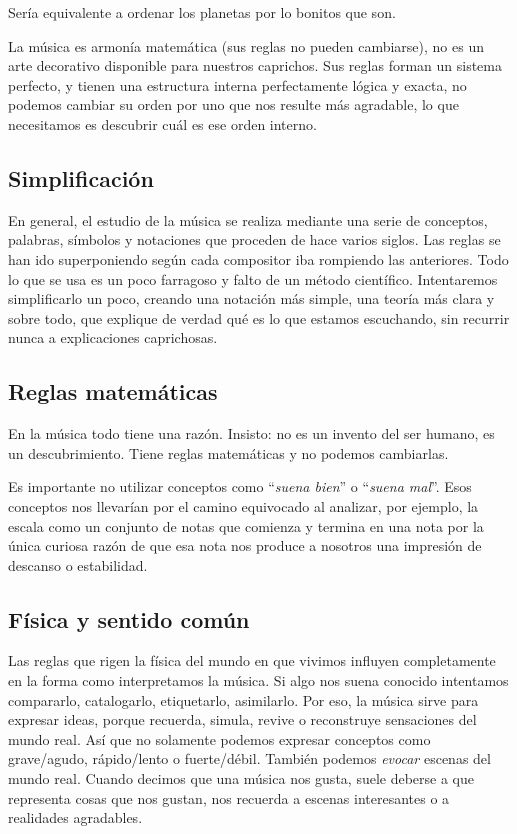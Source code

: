 \documentclass[]{report}
\begin{document}
Sería equivalente a ordenar los planetas por lo bonitos que son.

La música es armonía matemática (sus reglas no pueden cambiarse), no es un arte decorativo disponible para nuestros caprichos. Sus reglas forman un sistema perfecto, y tienen una estructura interna perfectamente lógica y exacta, no podemos cambiar su orden por uno que nos resulte más agradable, lo que necesitamos es descubrir cuál es ese orden interno.

\subsection{Simplificación}

En general, el estudio de la música se realiza mediante una serie de conceptos, palabras, símbolos y notaciones que proceden de hace varios siglos. Las reglas se han ido superponiendo según cada compositor iba rompiendo las anteriores. Todo lo que se usa es un poco farragoso y falto de un método científico. Intentaremos simplificarlo un poco, creando una notación más simple, una teoría más clara y sobre todo, que explique de verdad qué es lo que estamos escuchando, sin recurrir nunca a explicaciones caprichosas.

\subsection{Reglas matemáticas}

En la música todo tiene una razón. Insisto: no es un invento del ser humano, es un descubrimiento. Tiene reglas matemáticas y no podemos cambiarlas.

Es importante no utilizar conceptos como ``\emph{suena   bien}'' o ``\emph{suena mal}''. Esos conceptos nos llevarían por el camino equivocado al analizar, por ejemplo, la escala como un conjunto de notas que comienza y termina en una nota por la única curiosa razón de que esa nota nos produce a nosotros una impresión de descanso o estabilidad.

\subsection{Física y sentido común}

Las reglas que rigen la física del mundo en que vivimos influyen completamente en la forma como interpretamos la música. Si algo nos suena conocido intentamos compararlo, catalogarlo, etiquetarlo, asimilarlo. Por eso, la música sirve para expresar ideas, porque recuerda, simula, revive o reconstruye sensaciones del mundo real. Así que no solamente podemos expresar conceptos como grave/agudo, rápido/lento o fuerte/débil. También podemos \emph{evocar} escenas del mundo real. Cuando decimos que una música nos gusta, suele deberse a que representa cosas que nos gustan, nos recuerda a escenas interesantes o a realidades agradables.
\end{document}
